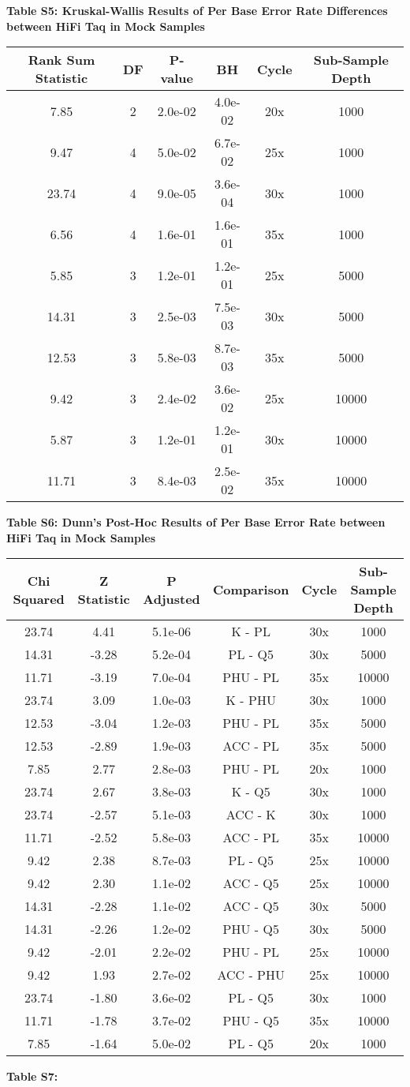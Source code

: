 \documentclass[12pt,]{article}
\begin{document}
\newpage

\textbf{Table S5: Kruskal-Wallis Results of Per Base Error Rate
Differences between HiFi Taq in Mock Samples}

\begin{longtable}[]{@{}cccccc@{}}
\toprule
Rank Sum Statistic & DF & P-value & BH & Cycle & Sub-Sample
Depth\tabularnewline
\midrule
\endhead
7.85 & 2 & 2.0e-02 & 4.0e-02 & 20x & 1000\tabularnewline
9.47 & 4 & 5.0e-02 & 6.7e-02 & 25x & 1000\tabularnewline
23.74 & 4 & 9.0e-05 & 3.6e-04 & 30x & 1000\tabularnewline
6.56 & 4 & 1.6e-01 & 1.6e-01 & 35x & 1000\tabularnewline
5.85 & 3 & 1.2e-01 & 1.2e-01 & 25x & 5000\tabularnewline
14.31 & 3 & 2.5e-03 & 7.5e-03 & 30x & 5000\tabularnewline
12.53 & 3 & 5.8e-03 & 8.7e-03 & 35x & 5000\tabularnewline
9.42 & 3 & 2.4e-02 & 3.6e-02 & 25x & 10000\tabularnewline
5.87 & 3 & 1.2e-01 & 1.2e-01 & 30x & 10000\tabularnewline
11.71 & 3 & 8.4e-03 & 2.5e-02 & 35x & 10000\tabularnewline
\bottomrule
\end{longtable}

\newpage

\textbf{Table S6: Dunn's Post-Hoc Results of Per Base Error Rate between
HiFi Taq in Mock Samples}

\begin{longtable}[]{@{}cccccc@{}}
\toprule
Chi Squared & Z Statistic & P Adjusted & Comparison & Cycle & Sub-Sample
Depth\tabularnewline
\midrule
\endhead
23.74 & 4.41 & 5.1e-06 & K - PL & 30x & 1000\tabularnewline
14.31 & -3.28 & 5.2e-04 & PL - Q5 & 30x & 5000\tabularnewline
11.71 & -3.19 & 7.0e-04 & PHU - PL & 35x & 10000\tabularnewline
23.74 & 3.09 & 1.0e-03 & K - PHU & 30x & 1000\tabularnewline
12.53 & -3.04 & 1.2e-03 & PHU - PL & 35x & 5000\tabularnewline
12.53 & -2.89 & 1.9e-03 & ACC - PL & 35x & 5000\tabularnewline
7.85 & 2.77 & 2.8e-03 & PHU - PL & 20x & 1000\tabularnewline
23.74 & 2.67 & 3.8e-03 & K - Q5 & 30x & 1000\tabularnewline
23.74 & -2.57 & 5.1e-03 & ACC - K & 30x & 1000\tabularnewline
11.71 & -2.52 & 5.8e-03 & ACC - PL & 35x & 10000\tabularnewline
9.42 & 2.38 & 8.7e-03 & PL - Q5 & 25x & 10000\tabularnewline
9.42 & 2.30 & 1.1e-02 & ACC - Q5 & 25x & 10000\tabularnewline
14.31 & -2.28 & 1.1e-02 & ACC - Q5 & 30x & 5000\tabularnewline
14.31 & -2.26 & 1.2e-02 & PHU - Q5 & 30x & 5000\tabularnewline
9.42 & -2.01 & 2.2e-02 & PHU - PL & 25x & 10000\tabularnewline
9.42 & 1.93 & 2.7e-02 & ACC - PHU & 25x & 10000\tabularnewline
23.74 & -1.80 & 3.6e-02 & PL - Q5 & 30x & 1000\tabularnewline
11.71 & -1.78 & 3.7e-02 & PHU - Q5 & 35x & 10000\tabularnewline
7.85 & -1.64 & 5.0e-02 & PL - Q5 & 20x & 1000\tabularnewline
\bottomrule
\end{longtable}

\newpage

\textbf{Table S7: }
\end{document}

